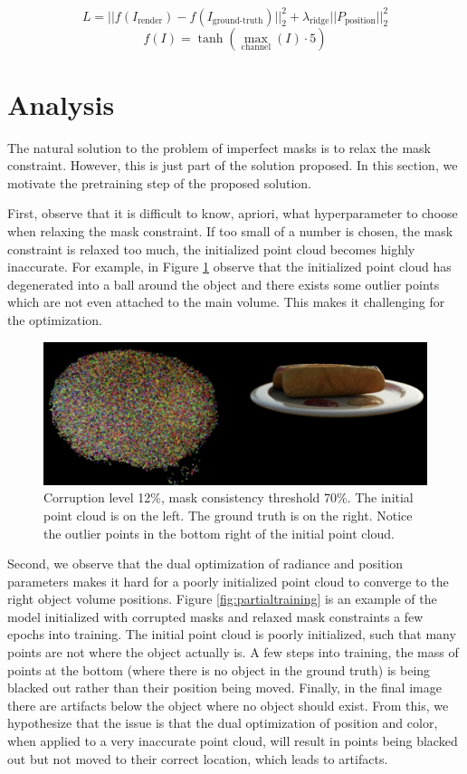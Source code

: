 \documentclass[10pt,twocolumn,letterpaper]{article}
\begin{document}
$$L = ||f(I_\text{render}) - f(I_\text{ground-truth})||_2^2 +\lambda_\text{ridge} ||P_\text{position}||_2^2$$
$$f(I) = \tanh{(\max_\text{channel}(I) \cdot 5)}$$

\section{Analysis}


The natural solution to the problem of imperfect masks is to relax the mask constraint. However, this is just part of the solution proposed. In this section, we motivate the pretraining step of the proposed solution.

First, observe that it is difficult to know, apriori, what hyperparameter to choose when relaxing the mask constraint. If too small of a number is chosen, \ie the mask constraint is relaxed too much, the initialized point cloud becomes highly inaccurate. For example, in Figure \ref{fig:outliers} observe that the initialized point cloud has degenerated into a ball around the object and there exists some outlier points which are not even attached to the main volume. This makes it challenging for the optimization.

\begin{figure}[h]
\centering
    \includegraphics[width=0.90\linewidth]{figures/c12m70-init-outliers.png} 
    \caption{Corruption level 12\%, mask consistency threshold 70\%. The initial point cloud is on the left. The ground truth is on the right. Notice the outlier points in the bottom right of the  initial point cloud.}
\label{fig:outliers}
\end{figure}

Second, we observe that the dual optimization of radiance and position parameters makes it hard for a poorly initialized point cloud to converge to the right object volume positions. Figure \ref{fig:partialtraining} is an example of the model initialized with corrupted masks and relaxed mask constraints a few epochs into training. The initial point cloud is poorly initialized, such that many points are not where the object actually is. A few steps into training, the mass of points at the bottom (where there is no object in the ground truth) is being blacked out rather than their position being moved. Finally, in the final image there are artifacts below the object where no object should exist. From this, we hypothesize that the issue is that the dual optimization of position and color, when applied to a very inaccurate point cloud, will result in points being blacked out but not moved to their correct location, which leads to artifacts.
\end{document}
